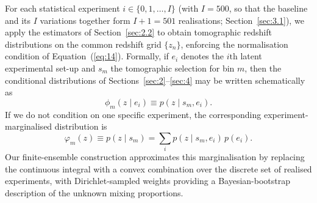 For each statistical experiment \(i \in \{0, 1, \ldots, I\}\) (with \(I = 500\), so that the baseline and its \(I\) variations together form \(I+1 = 501\) realisations; Section~\ref{sec:3.1}), we apply the estimators of Section~\ref{sec:2.2} to obtain tomographic redshift distributions on the common redshift grid \(\{z_n\}\), enforcing the normalisation condition of Equation~(\ref{eq:14}). Formally, if \(e_i\) denotes the \(i\text{th}\) latent experimental set-up and \(s_m\) the tomographic selection for bin \(m\), then the conditional distributions of Sections~\ref{sec:2}--\ref{sec:4} may be written schematically as
\begin{equation} \label{eq:23}
    \phi_m(z \mid e_i) \equiv p(z \mid s_m, e_i).
\end{equation}
If we do not condition on one specific experiment, the corresponding experiment-marginalised distribution is
\begin{equation} \label{eq:24}
    \varphi_m(z) \equiv p(z \mid s_m) = \sum_{i} p(z \mid s_m, e_i)\, p(e_i).
\end{equation}
Our finite-ensemble construction approximates this marginalisation by replacing the continuous integral with a convex combination over the discrete set of realised experiments, with Dirichlet-sampled weights providing a Bayesian-bootstrap description of the unknown mixing proportions.

